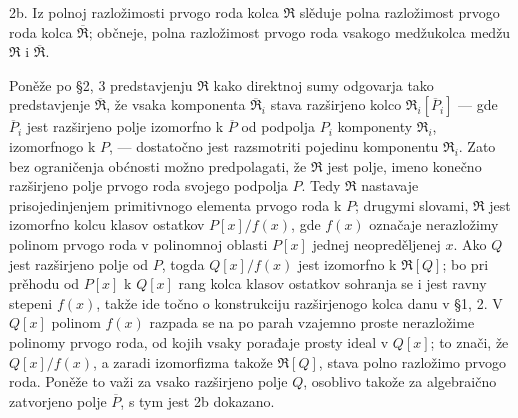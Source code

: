 \documentclass[11pt]{article}
\begin{document}
\setcounter{footnote}{22}

2b. Iz polnoj razložimosti prvogo roda kolca $\mathfrak R$ slěduje polna razložimost prvogo roda kolca $\overline{\mathfrak R}$; občneje, polna razložimost prvogo roda vsakogo medžukolca medžu $\mathfrak R$ i $\overline{\mathfrak R}$.

Poněže po \S 2, 3 predstavjenju $\mathfrak R$ kako direktnoj sumy odgovarja tako predstavjenje $\overline{\mathfrak R}$, že vsaka komponenta $\overline{\mathfrak R}_i$ stava razširjeno kolco $\mathfrak R_i[\overline P_i]$ --- gde $\overline P_i$ jest razširjeno polje izomorfno k $\overline P$ od podpolja $P_i$ komponenty $\mathfrak R_i$, izomorfnogo k $P$, --- dostatočno jest razsmotriti pojedinu komponentu $\mathfrak R_i$. Zato bez ograničenja obćnosti možno predpolagati, že $\mathfrak R$ jest polje, imeno konečno razširjeno polje prvogo roda svojego podpolja $P$. Tedy $\mathfrak R$ nastavaje prisojedinjenjem primitivnogo elementa prvogo roda k $P$; drugymi slovami, $\mathfrak R$ jest izomorfno kolcu klasov ostatkov $P[x]/f(x)$, gde $f(x)$ označaje nerazložimy polinom prvogo roda v polinomnoj oblasti $P[x]$ jednej neopreděljenej $x$. Ako $Q$ jest razširjeno polje od $P$, togda $Q[x]/f(x)$ jest izomorfno k $\mathfrak R[Q]$; bo pri prěhodu od $P[x]$ k $Q[x]$ rang kolca klasov ostatkov sohranja se i jest ravny stepeni $f(x)$, takže ide točno o konstrukciju razširjenogo kolca danu v \S 1, 2. V $Q[x]$ polinom $f(x)$ razpada se na po parah vzajemno proste nerazložime polinomy prvogo roda, od kojih vsaky porađaje prosty ideal v $Q[x]$; to znači, že $Q[x]/f(x)$, a zaradi izomorfizma takože $\mathfrak R[Q]$, stava polno razložimo prvogo roda. Poněže to važi za vsako razširjeno polje $Q$, osoblivo takože za algebraično zatvorjeno polje $\overline P$, s tym jest 2b dokazano.
\end{document}
